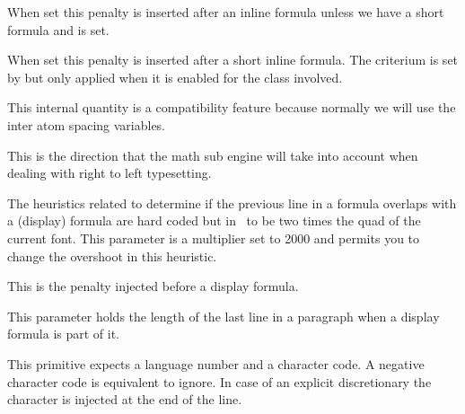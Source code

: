 When set this penalty is inserted after an inline formula unless we have a short
formula and  is set.

\stopnewprimitive

\startnewprimitive[title={\prm {postshortinlinepenalty}}]

When set this penalty is inserted after a short inline formula. The criterium is
set by  but only applied when it is enabled for
the class involved.

\stopnewprimitive

\startnewprimitive[title={\prm {prebinoppenalty}}]

This internal quantity is a compatibility feature because normally we will use
the inter atom spacing variables.

\stopnewprimitive

\startoldprimitive[title={\prm {predisplaydirection}}]

This is the direction that the math sub engine will take into account when
dealing with right to left typesetting.

\stopoldprimitive

\startnewprimitive[title={\prm {predisplaygapfactor}}]

The heuristics related to determine if the previous line in a formula overlaps
with a (display) formula are hard coded but in \LUATEX\ to be two times the quad
of the current font. This parameter is a multiplier set to 2000 and permits you
to change the overshoot in this heuristic.

\stopnewprimitive

\startoldprimitive[title={\prm {predisplaypenalty}}]

This is the penalty injected before a display formula.

\stopoldprimitive

\startoldprimitive[title={\prm {predisplaysize}}]

This parameter holds the length of the last line in a paragraph when a display
formula is part of it.

\stopoldprimitive

\startnewprimitive[title={\prm {preexhyphenchar}}]

This primitive expects a language number and a character code. A negative
character code is equivalent to ignore. In case of an explicit discretionary the
character is injected at the end of the line.

\stopnewprimitive

